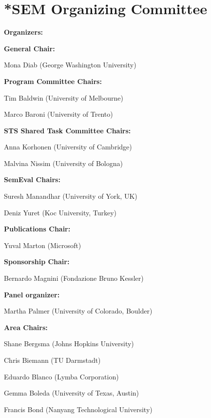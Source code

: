 \section*{*SEM Organizing Committee}

\begin{description}
\item{\bf Organizers:}%
%
\begin{description}
\item{\bf General Chair:}

Mona Diab (George Washington University)

\item{\bf Program Committee Chairs:}

Tim Baldwin (University of Melbourne)

Marco Baroni (University of Trento)

\item{\bf STS Shared Task Committee Chairs:}

Anna Korhonen (University of Cambridge)

Malvina Nissim (University of Bologna)

\item{\bf SemEval Chairs:}

Suresh Manandhar (University of York, UK)

Deniz Yuret (Koc University, Turkey)

\item{\bf Publications Chair:}

Yuval Marton (Microsoft)

\item{\bf Sponsorship Chair:}

Bernardo Magnini (Fondazione Bruno Kessler)

\item{\bf Panel organizer:}

Martha Palmer (University of Colorado, Boulder)

\item{\bf Area Chairs:}


    Shane Bergsma (Johns Hopkins University)

    Chris Biemann (TU Darmstadt)

    Eduardo Blanco (Lymba Corporation)

    Gemma Boleda (University of Texas, Austin)

    Francis Bond (Nanyang Technological University)


\end{description}
\end{description}
